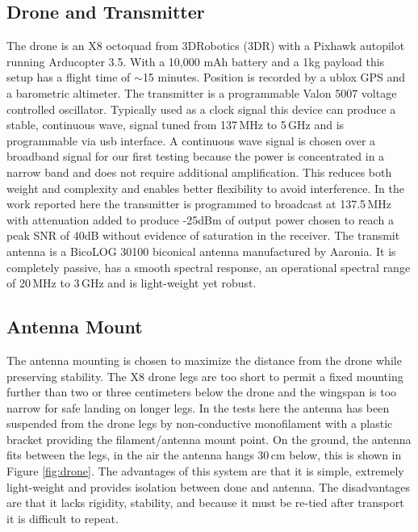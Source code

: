 \documentclass[preprint2,numberedappendix,tighten,twocolappendix]{aastex6}
\begin{document}
\subsection{Drone and Transmitter}
The drone is an X8 octoquad from 3DRobotics (3DR) with a Pixhawk autopilot running Arducopter 3.5.  With a 10,000 mAh battery and a 1kg payload this setup has a flight time of $\sim$15 minutes. Position is recorded by a ublox GPS and a barometric altimeter.  The transmitter is a programmable Valon 5007 voltage controlled oscillator. Typically used as a clock signal this device can produce a stable, continuous wave, signal tuned from 137\,MHz to 5\,GHz and is programmable via usb interface.  A continuous wave signal is chosen over a broadband signal for our first testing because the power is concentrated in a narrow band and does not require additional amplification. This reduces both weight and complexity and enables better flexibility to avoid interference.  In the work reported here the transmitter is programmed to broadcast at 137.5\,MHz with attenuation added to produce -25dBm of output power chosen to reach a peak SNR of 40dB without evidence of saturation in the receiver.  The transmit antenna is a BicoLOG 30100 biconical antenna manufactured by Aaronia. It is completely passive, has a smooth spectral response, an operational spectral range of 20\,MHz to 3\,GHz and is light-weight yet robust. 



\subsection{Antenna Mount}
The antenna mounting is chosen to maximize the distance from the drone while preserving stability. The X8 drone legs are too short to permit a fixed mounting further than two or three centimeters below the drone and the wingspan is too narrow for safe landing on longer legs. In the tests here the antenna has been suspended from the drone legs by non-conductive monofilament with a plastic bracket providing the filament/antenna mount point. On the ground, the antenna fits between the legs, in the air the antenna hangs 30\,cm below, this is shown in Figure \ref{fig:drone}. The advantages of this system are that it is simple, extremely light-weight and provides isolation between done and antenna. The disadvantages are that it lacks rigidity, stability, and because it must be re-tied after transport it is difficult to repeat.
\end{document}
